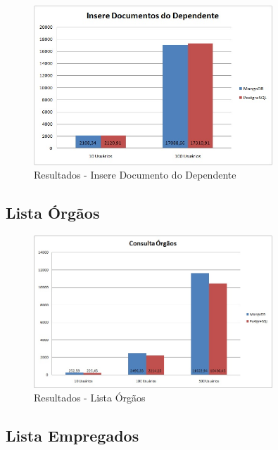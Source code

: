 \begin{figure}[!htbp]
	\begin{center}
		\includegraphics[width=0.8\textwidth]{resultados/insere_doc_dependentes}
	\end{center}
	\caption{Resultados - Insere Documento do Dependente}
	\label{fig:resultinseredocdependente}
\end{figure}

\subsection{Lista Órgãos}

\begin{figure}[!htbp]
	\begin{center}
		\includegraphics[width=0.8\textwidth]{resultados/consulta_orgaos}
	\end{center}
	\caption{Resultados - Lista Órgãos}
	\label{fig:resultlistaorgaos}
\end{figure}

\subsection{Lista Empregados}

